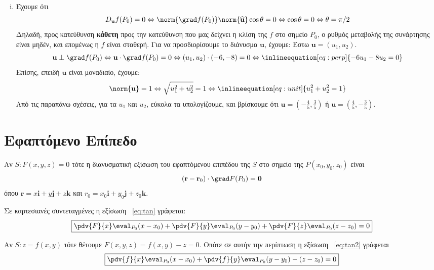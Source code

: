 \begin{solution}
\begin{enumerate}[i)]
    \item Έχουμε ότι 
      \[ 
        D_{\mathbf{u}}f(P_{0}) = 0 \Leftrightarrow \norm{\grad f (P_{0})}
        \norm{\mathbf{\widehat{u}}} \cos{\theta} = 0 \Leftrightarrow 
        \cos{\theta} = 0 \Leftrightarrow \theta = \pi/2 
      \]
      Δηλαδή, προς κατεύθυνση \textbf{κάθετη} προς την κατεύθυνση που μας δείχνει η 
      κλίση της $ f $ στο σημείο $ P_{0} $, ο ρυθμός μεταβολής της συνάρτησης είναι 
      μηδέν, και επομένως η $f$ είναι σταθερή. Για να προσδιορίσουμε το διάνυσμα $
      \mathbf{u} $, έχουμε: Έστω $ \mathbf{u} = (u_{1}, u_{2}) $. 
      \[
        \mathbf{u} \perp \grad f(P_{0}) \Leftrightarrow \mathbf{u} \cdot 
        \grad f (P_{0}) = 0 \Leftrightarrow (u_1,u_{2}) \cdot (-6,-8) =
        0 \Leftrightarrow \inlineequation[eq:perp]{-6u_{1}-8u_{2}=0}
      \]
      Επίσης, επειδή $ \mathbf{u} $ είναι μοναδιαίο, έχουμε: 
      \[
        \norm{\mathbf{u}} =1 \Leftrightarrow \sqrt{u_{1}^{2}+u_{2}^{2}} = 1
        \Leftrightarrow \inlineequation[eq:unit]{u_{1}^{2}+u_{2}^{2}=1}
      \] 
      Από τις παραπάνω σχέσεις, για τα $ u_{1} $ και $ u_{2} $, εύκολα τα υπολογίζουμε,
      και βρίσκουμε ότι $ \mathbf{u} = \left(- \frac{4}{5}
      , \frac{3}{5}\right) $ ή $ \mathbf{u} = 
      \left( \frac{4}{5} , - \frac{3}{5}\right) $. 
  \end{enumerate}
\end{solution}



\section{Εφαπτόμενο Επίπεδο}

\begin{myitemize}
  \item Αν $S: F(x,y,z)=0$ τότε η διανυσματική εξίσωση του εφαπτόμενου επιπέδου της $S$ 
    στο σημείο της $ P(x_{0}, y_{0}, z_{0}) $ είναι
    \begin{equation}\label{eq:tan}
      (\mathbf{r} - \mathbf{r}_{0})\cdot \grad F(P_{0})= \mathbf{0} 
    \end{equation} 
    όπου $ \mathbf{r}=x \mathbf{i}+y \mathbf{j}+z \mathbf{k} $ και 
    $ r_{0}=x_{0} \mathbf{i}+ y _{0} \mathbf{j}+ z_{0} \mathbf{k} $.

    Σε καρτεσιανές συντεταγμένες η εξίσωση ~\eqref{eq:tan} γράφεται:
    \begin{equation}\label{eq:tan2}
      \boxed{		
        \pdv{F}{x}\eval_{P_{0}} (x-x_{0}) + \pdv{F}{y}\eval_{P_{0}} (y-y_{0}) +
        \pdv{F}{z}\eval_{P_{0}} (z-z_{0}) =0 
      } 
    \end{equation}

  \item Αν $ S: z=f(x,y) $ τότε θέτουμε $ F(x,y,z) =  f(x,y) - z = 0 $. Οπότε σε
    αυτήν την περίπτωση η εξίσωση ~\eqref{eq:tan2} γράφεται
    \[
      \boxed{
        \pdv{f}{x}\eval_{P_{0}} (x - x_{0}) + 
        \pdv{f}{y}\eval_{P_{0}} (y - y_{0}) - (z - z_{0}) = 0 
      }
    \] 
\end{myitemize}

